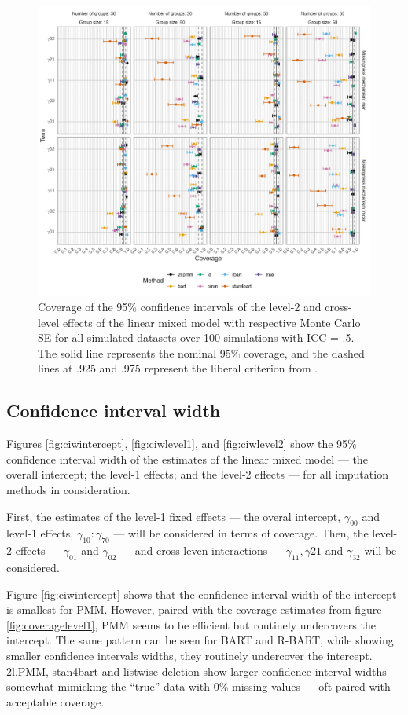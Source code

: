 \documentclass[10pt, a4paper, titlepage]{article}
\begin{document}
\begin{figure}[H]
    \centering
    \includegraphics[width=1\textwidth]{coveragelevel2.png}
    \caption{Coverage of the 95\% confidence intervals of the level-2 and cross-level effects of the linear mixed model with respective Monte Carlo SE for all simulated datasets over 100 simulations with ICC = .5. The solid line represents the nominal 95\% coverage, and the dashed lines at .925 and .975 represent the liberal criterion from \citet{bradley1978}.}
    \label{fig:coveragelevel2}
\end{figure}

\subsection{Confidence interval width}
Figures \ref{fig:ciwintercept}, \ref{fig:ciwlevel1}, and \ref{fig:ciwlevel2} show the 95\% confidence interval width of the estimates of the linear mixed model --- the overall intercept; the level-1 effects; and the level-2 effects --- for all imputation methods in consideration.

First, the estimates of the level-1 fixed effects --- the overal intercept, $\gamma_{00}$ and level-1 effects, $\gamma_{10}:\gamma_{70}$ --- will be considered in terms of coverage. Then, the level-2 effects --- $\gamma_{01}$ and $\gamma_{02}$ --- and cross-leven interactions --- $\gamma_{11}, \gamma{21}$ and $\gamma_{32}$ will be considered.

Figure \ref{fig:ciwintercept} shows that the confidence interval width of the intercept is smallest for PMM. However, paired with the coverage estimates from figure \ref{fig:coveragelevel1}, PMM seems to be efficient but routinely undercovers the intercept. The same pattern can be seen for BART and R-BART, while showing smaller confidence intervals widths, they routinely undercover the intercept. 2l.PMM, stan4bart and listwise deletion show larger confidence interval widths --- somewhat mimicking the ``true'' data with 0\% missing values --- oft paired with acceptable coverage.
\end{document}
